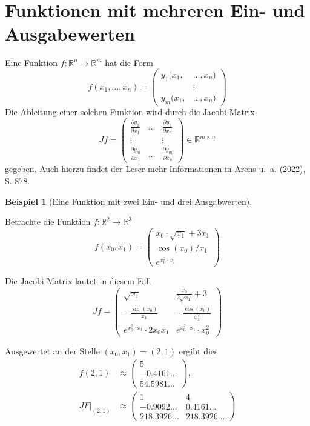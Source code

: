 \documentclass[
  a4paper,
  DIV=11]{scrreprt}
\theoremstyle{definition}
\theoremstyle{definition}
\newtheorem{example}{Beispiel}[chapter]
\theoremstyle{remark}
\begin{document}
\hypertarget{sec-FuncRnToRm}{%
\section{Funktionen mit mehreren Ein- und
Ausgabewerten}\label{sec-FuncRnToRm}}

Eine Funktion \(f : \mathbb{R}^n \rightarrow \mathbb{R}^m\) hat die Form
\[
f(x_1, \ldots, x_n) = \left( \begin{align*} y_1(x_1, &\ldots, x_n) \\ &\vdots \\ y_m(x_1, &\ldots, x_n) \end{align*} \right)
\] Die Ableitung einer solchen Funktion wird durch die Jacobi Matrix \[
Jf = \begin{pmatrix}
    \frac{\partial y_1}{\partial x_1} & \ldots & \frac{\partial y_1}{\partial x_n} \\
    \vdots & & \vdots \\
    \frac{\partial y_m}{\partial x_1} & \ldots & \frac{\partial y_m}{\partial x_n}
\end{pmatrix}
\in\mathbb{R}^{m\times n}
\] gegeben. Auch hierzu findet der Leser mehr Informationen in Arens
u.~a. (2022), S. 878.

\begin{example}[Eine Funktion mit zwei Ein- und drei
Ausgabwerten]\protect\hypertarget{exm-ExFunctionR2ToR3}{}\label{exm-ExFunctionR2ToR3}

Betrachte die Funktion \(f : \mathbb{R}^2 \rightarrow \mathbb{R}^3\) \[
f(x_0, x_1) = 
    \begin{pmatrix}
        x_0\cdot \sqrt{x_1} + 3x_1 \\
        \cos(x_0) / x_1 \\
        e^{x_0 ^2\cdot x_1}
    \end{pmatrix}
\]

Die Jacobi Matrix lautet in diesem Fall \[
Jf = 
\begin{pmatrix}
    \sqrt{x_1} & \frac{x_0}{2\sqrt{x_1}} + 3 \\
    -\frac{\sin(x_0)}{x_1} & -\frac{\cos(x_0)}{x_1^2} \\
    e^{x_0^2\cdot x_1}\cdot 2 x_0 x_1 & e^{x_0^2\cdot x_1}\cdot x_0^2
\end{pmatrix}
\]

Ausgewertet an der Stelle \((x_0, x_1) = (2, 1)\) ergibt dies
\begin{align*}
f(2,1) &\approx \begin{pmatrix} 5 \\ -0.4161... \\ 54.5981... \end{pmatrix}, \\ 
JF \vert _{(2,1)} &\approx 
    \begin{pmatrix}  
        1 & 4 \\
        -0.9092... & 0.4161... \\
        218.3926... & 218.3926...
    \end{pmatrix}
\end{align*}

\end{example}
\end{document}
